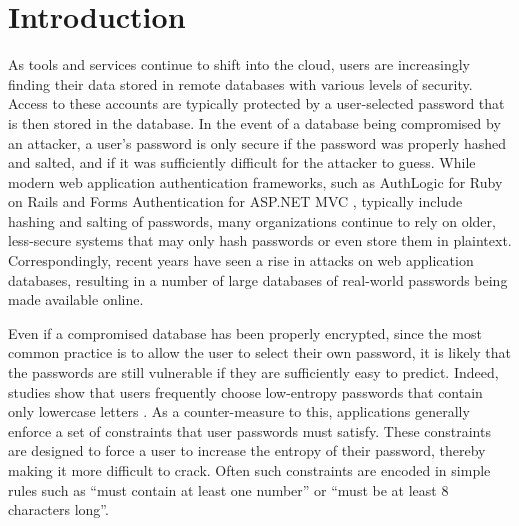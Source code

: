 \documentclass{acm_proc_article-sp}
\begin{document}
\maketitle
\begin{abstract}

\end{abstract}



\section{Introduction}
As tools and services continue to shift into the cloud, users are increasingly finding their data stored in remote databases with various levels of security. Access to these accounts are typically protected by a user-selected password that is then stored in the database. In the event of a database being compromised by an attacker, a user's password is only secure if the password was properly hashed and salted, and if it was sufficiently difficult for the attacker to guess. While modern web application authentication frameworks, such as AuthLogic for Ruby on Rails \cite{authlogic} and Forms Authentication for ASP.NET MVC \cite{formsauth}, typically include hashing and salting of passwords, many organizations continue to rely on older, less-secure systems that may only hash passwords or even store them in plaintext. Correspondingly, recent years have seen a rise in attacks on web application databases, resulting in a number of large databases of real-world passwords being made available online\cite{skullsecurity}.

Even if a compromised database has been properly encrypted, since the most common practice is to allow the user to select their own password, it is likely that the passwords are still vulnerable if they are sufficiently easy to predict. Indeed, studies show that users frequently choose low-entropy passwords that contain only lowercase letters \cite{florencio-www07}. As a counter-measure to this, applications generally enforce a set of constraints that user passwords must satisfy. These constraints are designed to force a user to increase the entropy of their password, thereby making it more difficult to crack. Often such constraints are encoded in simple rules such as ``must contain at least one number'' or ``must be at least 8 characters long''.
\end{document}
